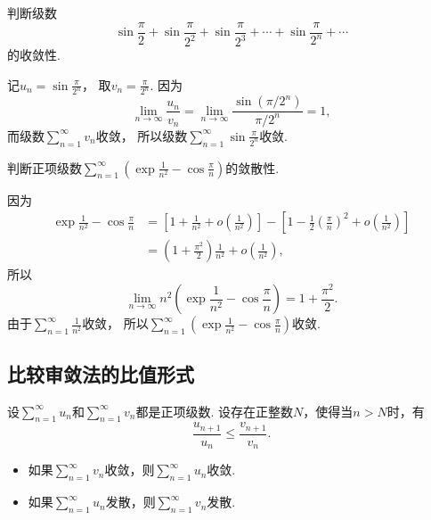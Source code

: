 \begin{example}
\newcommand\sinfrac[1][]{\sin\frac{\pi}{2^{#1}}}
判断级数\[
	\sinfrac + \sinfrac[2] + \sinfrac[3] + \dotsb + \sinfrac[n] + \dotsb
\]的收敛性.
\begin{solution}
记\(u_n = \sin\frac{\pi}{2^n}\)，
取\(v_n = \frac{\pi}{2^n}\).
因为\[
	\lim_{n\to\infty} \frac{u_n}{v_n}
	= \lim_{n\to\infty} \frac{\sin(\pi/2^n)}{\pi/2^n}
	= 1,
\]
而级数\(\sum_{n=1}^\infty v_n\)收敛，
所以级数\(\sum_{n=1}^\infty \sin\frac{\pi}{2^n}\)收敛.
\end{solution}
\end{example}

\begin{example}
判断正项级数\(\sum_{n=1}^\infty \left(\exp\frac1{n^2}-\cos\frac\pi{n}\right)\)的敛散性.
\begin{solution}
因为\begin{align*}
	\exp\frac1{n^2}-\cos\frac\pi{n}
	&= \left[1+\frac1{n^2}+o\left(\frac1{n^2}\right)\right]
	- \left[1-\frac12\left(\frac\pi{n}\right)^2+o\left(\frac1{n^2}\right)\right] \\
	&= \left(1+\frac{\pi^2}2\right) \frac1{n^2} + o\left(\frac1{n^2}\right),
\end{align*}
所以\[
	\lim_{n\to\infty} n^2 \left(\exp\frac1{n^2}-\cos\frac\pi{n}\right)
	= 1+\frac{\pi^2}2.
\]
由于\(\sum_{n=1}^\infty \frac1{n^2}\)收敛，
所以\(\sum_{n=1}^\infty \left(\exp\frac1{n^2}-\cos\frac\pi{n}\right)\)收敛.
\end{solution}
\end{example}

\subsection{比较审敛法的比值形式}
\begin{theorem}\label{theorem:无穷级数.比较审敛法的比值形式}
设\(\sum_{n=1}^\infty u_n\)和\(\sum_{n=1}^\infty v_n\)都是正项级数.
设存在正整数\(N\)，使得当\(n>N\)时，有\[
	\frac{u_{n+1}}{u_n} \leq \frac{v_{n+1}}{v_n}.
\]
\begin{itemize}
	\item 如果\(\sum_{n=1}^\infty v_n\)收敛，则\(\sum_{n=1}^\infty u_n\)收敛.
	\item 如果\(\sum_{n=1}^\infty u_n\)发散，则\(\sum_{n=1}^\infty v_n\)发散.
\end{itemize}
\end{theorem}

